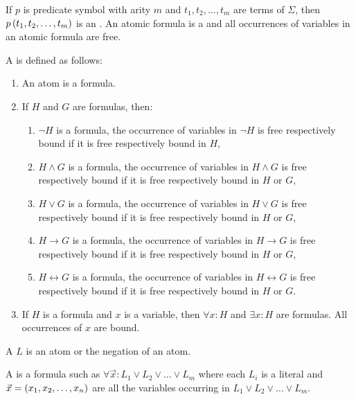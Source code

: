 \begin{defi}[Atom]
If $p$ is predicate symbol with arity $m$ and $t_1,t_2,\ldots,t_m$ are terms of $\Sigma$, then $p\left(t_1,t_2,\ldots,t_m\right)$ is an . An atomic formula is a  and all occurrences of variables in an atomic formula are free.
\cite{conf/fedcsis/Telnarova12}
\end{defi}

\begin{defi}[Formula]
A  is defined as follows:
\begin{enumerate}
 \item An atom is a formula.
 \item If $H$ and $G$ are formulas, then:
 \begin{enumerate}
  \item $\neg H$ is a formula, the occurrence of variables in $\neg H$ is free respectively bound if it is free respectively bound in $H$,
  \item $H\wedge G$ is a formula, the occurrence of variables in $H\wedge G$ is free respectively bound if it is free respectively bound in $H$ or $G$,
  \item $H\vee G$ is a formula, the occurrence of variables in $H\vee G$ is free respectively bound if it is free respectively bound in $H$ or $G$,
  \item $H\rightarrow G$ is a formula, the occurrence of variables in $H\rightarrow G$ is free respectively bound if it is free respectively bound in $H$ or $G$,
  \item $H\leftrightarrow G$ is a formula, the occurrence of variables in $H\leftrightarrow G$ is free respectively bound if it is free respectively bound in $H$ or $G$.
 \end{enumerate}
 \item If $H$ is a formula and $x$ is a variable, then $\forall x:H$ and $\exists x:H$ are formulas. All occurrences of $x$ are bound.
\end{enumerate}
\cite{conf/fedcsis/Telnarova12}
\end{defi}

\begin{defi}[Literal]
A  $L$ is an atom or the negation of an atom.
\cite{conf/fedcsis/Telnarova12}
\end{defi}

\begin{defi}[Clause]
A  is a formula such as $\forall\vec{x}:L_1\vee L_2\vee\ldots\vee L_m$ where each $L_i$ is a literal and $\vec{x}=\left( x_1,x_2,\ldots,x_n\right)$ are all the variables occurring in $L_1\vee L_2\vee\ldots\vee L_m$.
\cite{conf/fedcsis/Telnarova12}
\end{defi}

